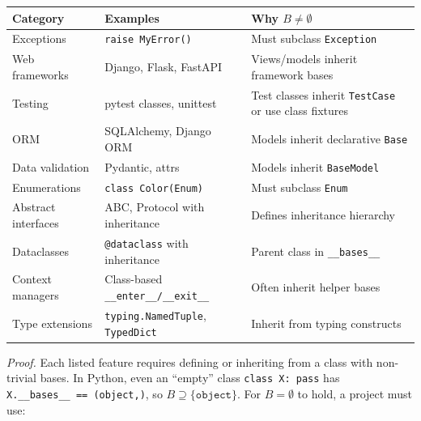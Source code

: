 \small
\begin{longtable}[]{@{}
  >{\raggedright\arraybackslash}p{}
  >{\raggedright\arraybackslash}p{}
  >{\raggedright\arraybackslash}p{}@{}}
\toprule\noalign{}
\begin{minipage}[b]{\linewidth}\raggedright
Category
\end{minipage} & \begin{minipage}[b]{\linewidth}\raggedright
Examples
\end{minipage} & \begin{minipage}[b]{\linewidth}\raggedright
Why \(B \neq \emptyset\)
\end{minipage} \\
\midrule\noalign{}
\endhead
\bottomrule\noalign{}
\endlastfoot
Exceptions & \texttt{raise\ MyError()} & Must subclass
\texttt{Exception} \\
Web frameworks & Django, Flask, FastAPI & Views/models inherit framework
bases \\
Testing & pytest classes, unittest & Test classes inherit
\texttt{TestCase} or use class fixtures \\
ORM & SQLAlchemy, Django ORM & Models inherit declarative
\texttt{Base} \\
Data validation & Pydantic, attrs & Models inherit \texttt{BaseModel} \\
Enumerations & \texttt{class\ Color(Enum)} & Must subclass
\texttt{Enum} \\
Abstract interfaces & ABC, Protocol with inheritance & Defines
inheritance hierarchy \\
Dataclasses & \texttt{@dataclass} with inheritance & Parent class in
\texttt{\_\_bases\_\_} \\
Context managers & Class-based \texttt{\_\_enter\_\_/\_\_exit\_\_} &
Often inherit helper bases \\
Type extensions & \texttt{typing.NamedTuple}, \texttt{TypedDict} &
Inherit from typing constructs \\
\end{longtable}

\emph{Proof.} Each listed feature requires defining or inheriting from a
class with non-trivial bases. In Python, even an ``empty'' class
\texttt{class\ X:\ pass} has \texttt{X.\_\_bases\_\_\ ==\ (object,)}, so
\(B \supseteq \{\texttt{object}\}\). For \(B = \emptyset\) to hold, a
project must use:


